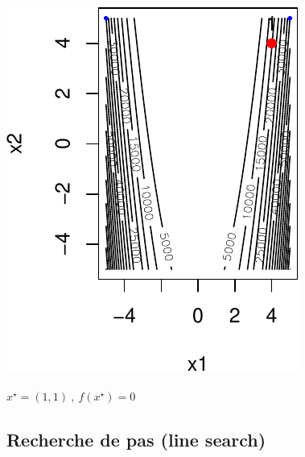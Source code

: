 \documentclass[12pt]{beamer}
\begin{document}
\begin{frame}
\begin{center}
\begin{minipage}[b]{0.3\textwidth}
\includegraphics[width=\textwidth]{gradient_rosen_alpha0.1_x_diverges-crop.pdf} 
\end{minipage}
$x^\star = (1,1) ~,~ f(x^\star) = 0$
\end{center}
\end{frame}

\subsection{Recherche de pas (line search)}
\end{document}
